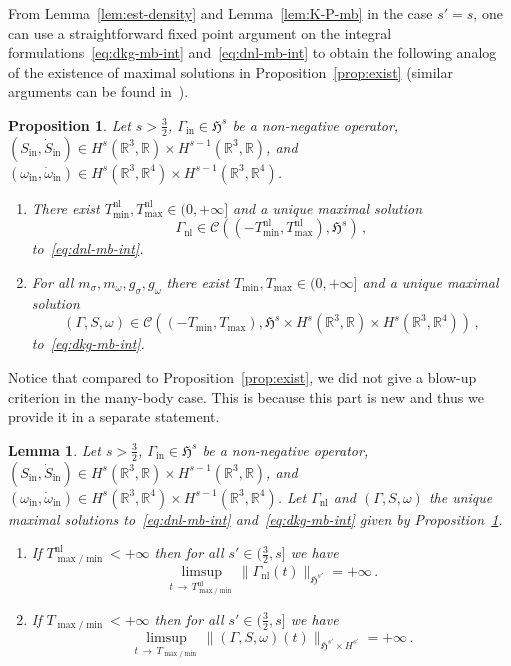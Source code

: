 \documentclass[10pt]{amsart}
\newtheorem{lemm}[theo]{Lemma}\newtheorem{prop}[theo]{Proposition}\newtheorem{coro}[theo]{Corollary}\newtheorem{conj}[theo]{Conjecture}
\theoremstyle{definition}\newtheorem{defi}[theo]{Definition}\newtheorem{rema}[theo]{Remark}\newtheorem{exam}[theo]{Example}\newtheorem{exem}[theo]{Example}\newtheorem{nota}[theo]{Notation}
\newcommand{\rmin}{\mathrm{in}}
\newcommand{\nl}{\mathrm{nl}}
\newcommand{\cC}{\mathcal{C}}
\newcommand\R{\mathbb{R}}
\newcommand{\gH}{\mathfrak{H}}
\newcommand*{\romanenumi}{\renewcommand*{\theenumi}{\roman{enumi}}}
\begin{document}
From Lemma~\ref{lem:est-density} and Lemma~\ref{lem:K-P-mb} in the case $s'=s$, one can use a straightforward fixed point argument on the integral formulations~\eqref{eq:dkg-mb-int} and~\eqref{eq:dnl-mb-int} to obtain the following analog of the existence of maximal solutions in Proposition~\ref{prop:exist} (similar arguments can be found in~\cite[Theorem~3]{LewSab-13a}).

\begin{prop}\label{prop:exist-mb}
Let $s>\tfrac32$, $\Gamma_\rmin\in \gH^s$ be a non-negative operator, $(S_\rmin,\dot{S}_\rmin)\in H^s(\R^3, \R)\times H^{s-1}(\R^3, \R)$, and $(\omega_\rmin,\dot{\omega}_\rmin)\in H^s(\R^3, \R^4)\times H^{s-1}(\R^3, \R^4)$.
\begin{enumerate}\romanenumi
\item\label{pt1.prop-mb}
There exist $T_{\min}^{\nl}, T_{\max}^{\nl}\in(0,+\infty]$ and a unique maximal solution
\[
\Gamma_{\nl}\in\cC\left(\left(-T_{\min}^{\nl}, T_{\max}^{\nl}\right),\gH^s\right)\,,
\]
to~\eqref{eq:dnl-mb-int}.
\item\label{pt2.prop-mb}
For all $m_\sigma, m_\omega, g_\sigma, g_\omega$ there exist $T_{\min}, T_{\max}\in(0,+\infty]$ and a unique maximal solution
\[
(\Gamma,S,\omega)\in \cC\left(\left(-T_{\min}, T_{\max}\right),\gH^s\times H^s\left(\R^3,\R\right)\times H^s\left(\R^3, \R^4\right)\right)\,,
\]
to~\eqref{eq:dkg-mb-int}.
\end{enumerate}
\end{prop}

Notice that compared to Proposition~\ref{prop:exist}, we did not give a blow-up criterion in the many-body case. This is because this part is new and thus we provide it in a separate statement.

\begin{lemm}\label{lem:blowup-crit-mb}
Let $s>\tfrac32$, $\Gamma_\rmin\in \gH^s$ be a non-negative operator, $(S_\rmin,\dot{S}_\rmin)\in H^s(\R^3, \R)\times H^{s-1}(\R^3, \R)$, and $(\omega_\rmin,\dot{\omega}_\rmin)\in H^s(\R^3, \R^4)\times H^{s-1}(\R^3, \R^4)$. Let $\Gamma_{\nl}$ and $(\Gamma,S,\omega)$ the unique maximal solutions to~\eqref{eq:dnl-mb-int} and~\eqref{eq:dkg-mb-int} given by Proposition~\ref{prop:exist-mb}.
\begin{enumerate}\romanenumi
\item If $T_{\max/\min}^{\nl}<+\infty$ then for all $s'\in(\tfrac32,s]$ we have
\[
\limsup_{t\,\to\,T_{\max/\min}^{\nl}}\|\Gamma_{\nl}(t)\|_{\gH^{s'}}= +\infty\,.
\]
\item If $T_{\max/\min}<+\infty$ then for all $s'\in(\tfrac32,s]$ we have
\begin{equation}\label{eq:blowup-crit-mb}
\limsup_{t\,\to\,T_{\max/\min}}\|(\Gamma,S,\omega)(t)\|_{\gH^{s'}\times H^{s'}} = +\infty\,. 
\end{equation}
\end{enumerate}
\end{lemm}
\end{document}
